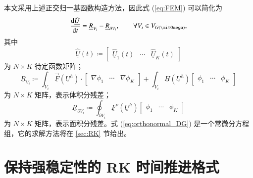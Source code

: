 本文采用上述正交归一基函数构造方法，因此式 (\ref{eq:FEM}) 可以简化为
\begin{equation}
\dv{\underline{\hat{U}}}{t}=\underline{R}_{V_{i}}-\underline{R}_{\partial V_{i}},\qquad\forall V_{i}\in V_{G(\varOmega)},\label{eq:orthonormal_DG}
\end{equation}
其中
\begin{equation}
\underline{\hat{U}}(t)\coloneqq\begin{bmatrix}\underline{\hat{U}}_{1}(t) & \cdots & \underline{\hat{U}}_{K}(t)\end{bmatrix}
\end{equation}
为 $N\times K$ 待定函数矩阵；
\begin{equation}
\underline{R}_{V_{i}}\coloneqq\int_{V_{i}}\mathopen{\underline{\vec{F}}}\left(\underline{U}^{h}\right)\cdot\begin{bmatrix}\nabla\phi_{1} & \cdots & \nabla\phi_{K}\end{bmatrix}+\int_{V_{i}}\mathopen{\underline{H}}\left(\underline{U}^{h}\right)\begin{bmatrix}\phi_{1} & \cdots & \phi_{K}\end{bmatrix}
\end{equation}
为 $N\times K$ 矩阵，表示体积分残差；
\begin{equation}
\underline{R}_{\partial V_{i}}\coloneqq\oint_{\partial V_{i}}\mathopen{\underline{F}^{\nu}}\left(\underline{U}^{h}\right)\begin{bmatrix}\phi_{1} & \cdots & \phi_{K}\end{bmatrix}\label{eq:boundary_residual}
\end{equation}
为 $N\times K$ 矩阵，表示面积分残差。式 (\ref{eq:orthonormal_DG}) 是一个常微分方程组，它的求解方法将在
\ref{sec:RK} 节给出。

\section{保持强稳定性的 RK 时间推进格式\label{sec:RK}}

